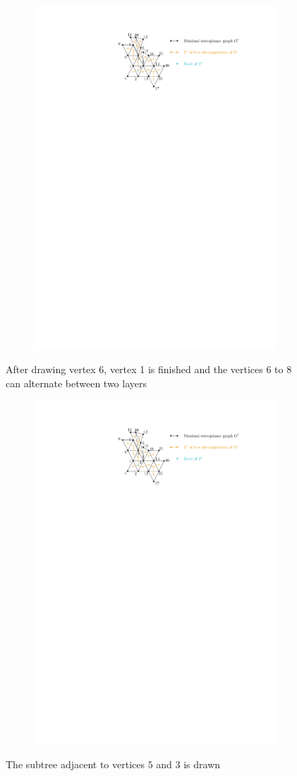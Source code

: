 \begin{figure}[H]
	\centering
	\begin{subfigure}{\textwidth}
		\centering
		\includegraphics[page=5,width=0.7\linewidth]{graphics/maximal_outerplanar_example_drawings.pdf}
	\end{subfigure}
	\caption{After drawing vertex $6$, vertex 1 is finished and the vertices 6 to 8 can alternate between two layers}
\end{figure}

\begin{figure}[H]
	\centering
	\begin{subfigure}{\textwidth}
		\centering
		\includegraphics[page=6,width=0.7\linewidth]{graphics/maximal_outerplanar_example_drawings.pdf}
	\end{subfigure}
	\caption{The subtree adjacent to vertices $5$ and $3$ is drawn}
\end{figure}

